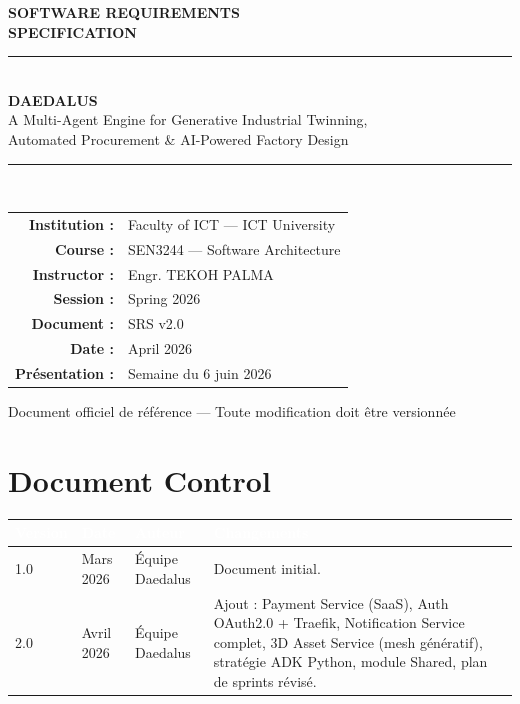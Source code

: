 \documentclass[12pt,a4paper]{article}
\begin{document}
\begin{titlepage}
  \pagecolor{daedalusdark}
  \color{white}
  \centering
  \vspace*{2cm}

  {\Huge\bfseries SOFTWARE REQUIREMENTS}\\[0.4em]
  {\Huge\bfseries SPECIFICATION}\\[2em]

  {\color{daedaluscyan}\rule{10cm}{2pt}}\\[1.5em]

  {\LARGE\bfseries DAEDALUS}\\[0.6em]
  {\large A Multi-Agent Engine for Generative Industrial Twinning,}\\[0.2em]
  {\large Automated Procurement \& AI-Powered Factory Design}\\[2.5em]

  {\color{daedaluscyan}\rule{10cm}{1pt}}\\[2em]

  \begin{tabular}{rl}
    \textbf{Institution :}   & Faculty of ICT — ICT University \\[0.3em]
    \textbf{Course :}        & SEN3244 — Software Architecture \\[0.3em]
    \textbf{Instructor :}    & Engr. TEKOH PALMA \\[0.3em]
    \textbf{Session :}       & Spring 2026 \\[0.3em]
    \textbf{Document :}      & SRS v2.0 \\[0.3em]
    \textbf{Date :}          & April 2026 \\[0.3em]
    \textbf{Présentation :}  & Semaine du 6 juin 2026 \\
  \end{tabular}

  \vfill
  {\color{daedalusgray}\small Document officiel de référence — Toute modification doit être versionnée}
\end{titlepage}

\pagecolor{white}
\color{black}
\newpage

\section*{Document Control}
\begin{tabularx}{\textwidth}{|l|l|l|X|}
\hline
\rowcolor{tablehead}\textcolor{white}{\textbf{Version}} & \textcolor{white}{\textbf{Date}} & \textcolor{white}{\textbf{Auteur}} & \textcolor{white}{\textbf{Changements}} \\
\hline
1.0 & Mars 2026    & Équipe Daedalus & Document initial. \\
\hline
2.0 & Avril 2026   & Équipe Daedalus & Ajout : Payment Service (SaaS), Auth OAuth2.0 + Traefik, Notification Service complet, 3D Asset Service (mesh génératif), stratégie ADK Python, module Shared, plan de sprints révisé. \\
\hline
\end{tabularx}
\end{document}
